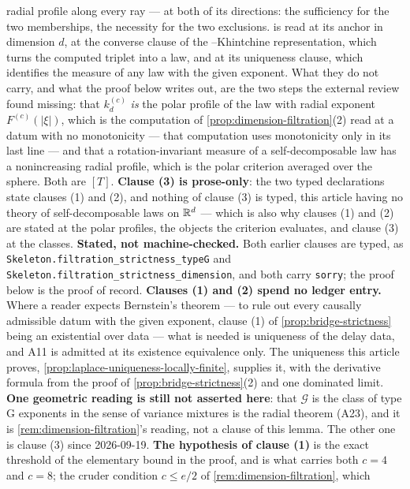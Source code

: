 \begin{lemma}
{radial profile along every ray --- at both of its directions: the sufficiency for the two
memberships, the necessity for the two exclusions.  is read at its anchor in dimension
$d$, at the converse clause of the \Levy--Khintchine representation, which turns the computed
triplet into a law, and at its uniqueness clause, which identifies the \Levy{} measure of any law
with the given exponent. What they do not carry, and what the proof below writes out, are the two
steps the external review found missing: that $k^{(c)}_d$ \emph{is} the polar profile of the law
with radial exponent $F^{(c)}(|\xi|)$, which is the computation of
\ref{prop:dimension-filtration}(2) read at a datum with no monotonicity --- that computation uses
monotonicity only in its last line --- and that a rotation-invariant \Levy{} measure of a
self-decomposable law has a nonincreasing radial profile, which is the polar criterion averaged
over the sphere. Both are $[T]$.
\textbf{Clause (3) is prose-only}: the two typed declarations state clauses (1) and (2), and
nothing of clause (3) is typed, this article having no theory of self-decomposable laws on
$\mathbb{R}^d$ --- which is also why clauses (1) and (2) are stated at the polar profiles, the objects
the criterion evaluates, and clause (3) at the classes.
\textbf{Stated, not machine-checked.} Both earlier clauses are typed, as
\texttt{Skeleton.filtration\_strictness\_typeG} and
\texttt{Skeleton.filtration\_strictness\_dimension}, and both carry \texttt{sorry}; the proof
below is the proof of record. \textbf{Clauses (1) and (2) spend no ledger entry.} Where a reader
expects Bernstein's theorem --- to rule out every causally admissible datum with the given
exponent, clause (1) of \ref{prop:bridge-strictness} being an existential over data --- what is
needed is uniqueness of the delay data, and A11 is admitted at its existence equivalence only. The
uniqueness this article proves, \ref{prop:laplace-uniqueness-locally-finite}, supplies it, with
the derivative formula from the proof of \ref{prop:bridge-strictness}(2) and one dominated limit.
\textbf{One geometric reading is still not asserted here}: that $\mathcal{G}$ is the class of type
G exponents in the sense of variance mixtures is the radial theorem (A23), and it is
\ref{rem:dimension-filtration}'s reading, not a clause of this lemma. The other one is clause (3)
since 2026-09-19. \textbf{The hypothesis of
clause (1)} is the exact threshold of the elementary bound in the proof, and is what carries both
$c = 4$ and $c = 8$; the cruder condition $c \le e/2$ of \ref{rem:dimension-filtration}, which
}
\end{lemma}

